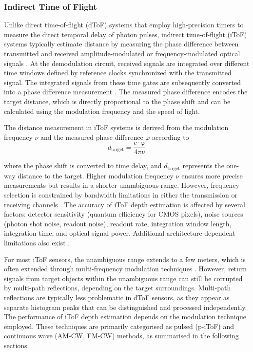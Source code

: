 \documentclass[12pt,a4paper,oneside]{report}
\begin{document}
\subsubsection{Indirect Time of Flight}
\label{subsubsec:indirect_tof}

Unlike direct time-of-flight (dToF) systems that employ high-precision timers to measure the direct temporal delay of photon pulses, indirect time-of-flight (iToF) systems typically estimate distance by measuring the phase difference between transmitted and received amplitude-modulated or frequency-modulated optical signals \cite{bamji2022}. At the demodulation circuit, received signals are integrated over different time windows defined by reference clocks synchronized with the transmitted signal. The integrated signals from these time gates are subsequently converted into a phase difference measurement \cite{bamji2022}. The measured phase difference encodes the target distance, which is directly proportional to the phase shift and can be calculated using the modulation frequency and the speed of light.

The distance measurement in iToF systems is derived from the modulation frequency $\nu$ and the measured phase difference $\varphi$ according to
\begin{equation}
d_{\text{target}} = \frac{c \cdot \varphi}{4 \pi \nu}
\label{eq:itof_distance}
\end{equation}
%
where the phase shift is converted to time delay, and $d_{\text{target}}$ represents the one-way distance to the target. Higher modulation frequency $\nu$ ensures more precise measurements but results in a shorter unambiguous range. However, frequency selection is constrained by bandwidth limitations in either the transmission or receiving channels \cite{bamji2022}. The accuracy of iToF depth estimation is affected by several factors: detector sensitivity (quantum efficiency for CMOS pixels), noise sources (photon shot noise, readout noise), readout rate, integration window length, integration time, and optical signal power. Additional architecture-dependent limitations also exist \cite{bamji2022}.

For most iToF sensors, the unambiguous range extends to a few meters, which is often extended through multi-frequency modulation techniques \cite{bamji2022}. However, return signals from target objects within the unambiguous range can still be corrupted by multi-path reflections, depending on the target surroundings. Multi-path reflections are typically less problematic in dToF sensors, as they appear as separate histogram peaks that can be distinguished and processed independently. The performance of iToF depth estimation depends on the modulation technique employed. These techniques are primarily categorised as pulsed (p-iToF) and continuous wave (AM-CW, FM-CW) methods, as summarised in the following sections.
\end{document}
